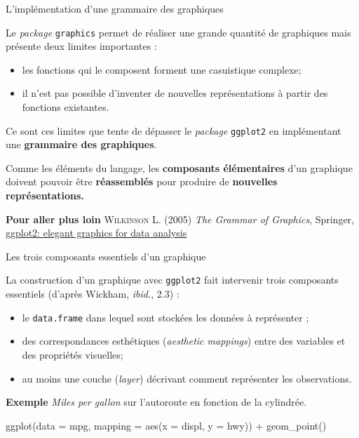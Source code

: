 \documentclass[12pt,handout,ignorenonframetext,]{beamer}
\newenvironment{Shaded}{}{}
\newcommand{\KeywordTok}[1]{\textcolor[rgb]{0.00,0.00,1.00}{#1}}
\newcommand{\DataTypeTok}[1]{#1}
\newcommand{\StringTok}[1]{\textcolor[rgb]{0.00,0.50,0.50}{#1}}
\newcommand{\OperatorTok}[1]{#1}
\newcommand{\NormalTok}[1]{#1}
\providecommand{\tightlist}{%
  \setlength{\itemsep}{0pt}\setlength{\parskip}{0pt}}
\renewenvironment{Shaded}{\begin{snugshade}}{\end{snugshade}}
\begin{document}
\begin{frame}[fragile]{\large L'implémentation d'une grammaire des
graphiques}

Le \emph{package} \texttt{graphics} permet de réaliser une grande
quantité de graphiques mais présente deux limites importantes :

\begin{itemize}
\tightlist
\item
  les fonctions qui le composent forment une casuistique complexe;
\item
  il n'est pas possible d'inventer de nouvelles représentations à partir
  des fonctions existantes.
\end{itemize}

\pause Ce sont ces limites que tente de dépasser le \emph{package}
\texttt{ggplot2} en implémentant une \textbf{grammaire des graphiques}.

Comme les éléments du langage, les \textbf{composants élémentaires} d'un
graphique doivent pouvoir être \textbf{réassemblés} pour produire de
\textbf{nouvelles représentations.}

\pause 

\textbf{Pour aller plus loin} \textsc{Wilkinson L.} (2005)
\textit{The Grammar of Graphics}, Springer,
\href{https://github.com/hadley/ggplot2-book}{\underline{ggplot2: elegant graphics for data analysis}}

\end{frame}

\begin{frame}[fragile]{\large Les trois composants essentiels d'un
graphique}

La construction d'un graphique avec \texttt{ggplot2} fait intervenir
trois composants essentiels (d'après Wickham, \emph{ibid.}, 2.3) :

\begin{itemize}
\tightlist
\item
  le \texttt{data.frame} dans lequel sont stockées les données à
  représenter ;
\item
  des correspondances esthétiques (\emph{aesthetic mappings}) entre des
  variables et des propriétés visuelles;
\item
  au moins une couche (\emph{layer}) décrivant comment représenter les
  observations.
\end{itemize}

\pause 

\textbf{Exemple} \emph{Miles per gallon} sur l'autoroute en fonction de
la cylindrée.

\center \small 

\begin{Shaded}
\begin{Highlighting}[]
\KeywordTok{ggplot}\NormalTok{(}\DataTypeTok{data =}\NormalTok{ mpg, }\DataTypeTok{mapping =} \KeywordTok{aes}\NormalTok{(}\DataTypeTok{x =}\NormalTok{ displ, }\DataTypeTok{y =}\NormalTok{ hwy)) }\OperatorTok{+}
\StringTok{  }\KeywordTok{geom_point}\NormalTok{()}
\end{Highlighting}
\end{Shaded}

\end{frame}
\end{document}
